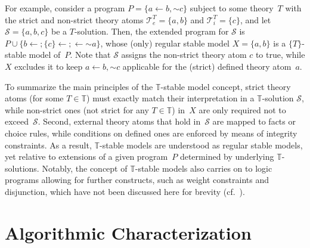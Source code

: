 \documentclass[a4paper,USenglish]{oasics-v2016}
\newcommand{\naf}[1]{\ensuremath{{\sim}{#1}}}
\begin{document}
For example, consider a program $P=\{a\leftarrow b,\naf{c}\}$ subject to
some theory~$T$ with the strict and non-strict theory atoms
$\mathcal{T}^T_e=\{a,b\}$ and $\mathcal{T}^T_i=\{c\}$,
and let $\mathcal{S}=\{a,b,c\}$ be a $T$-solution.
Then, the extended program for $\mathcal{S}$ is
$P\cup\{{b\leftarrow{}}; {\{c\}\leftarrow{}};  \leftarrow\naf{a}\}$,
whose (only) regular stable model $X=\{a,b\}$ is a $\{T\}$-stable model of~$P$.
Note that $\mathcal{S}$ assigns the non-strict theory atom $c$ to true,
while $X$ excludes it to keep
$a\leftarrow b,\naf{c}$ applicable
for the (strict) defined theory atom~$a$.

To summarize the main principles of the $\mathbb{T}$-stable model concept,
strict theory atoms (for some $T\in\mathbb{T}$) must exactly match their
interpretation in a $\mathbb{T}$-solution $\mathcal{S}$,
while non-strict ones (not strict for any $T\in\mathbb{T}$) in~$X$ are only required not to exceed~$\mathcal{S}$.
Second,
external theory atoms that hold in~$\mathcal{S}$ are mapped to facts or choice rules,
while conditions on defined ones are enforced by means of integrity constraints.
As a result, $\mathbb{T}$-stable models are understood as regular stable models,
%
yet relative to extensions of a given program~$P$
determined by underlying $\mathbb{T}$-solutions.
Notably, %
the concept of $\mathbb{T}$-stable models also carries on to logic programs allowing for
further constructs, such as weight constraints and disjunction,
which have not been discussed here for brevity (cf.~\cite{siniso02a}).

\section{Algorithmic Characterization}
\label{sec:algo}
\end{document}
